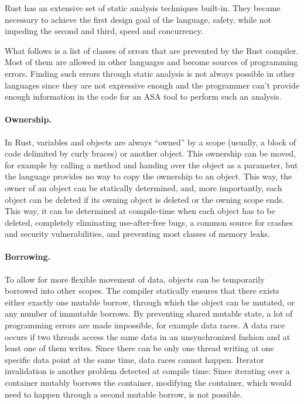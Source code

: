 \documentclass{scrartcl}
\begin{document}
Rust has an extensive set of static analysis techniques built-in. They became necessary to achieve the first design goal of the language, safety, while not impeding the second and third, speed and concurrency.

What follows is a list of classes of errors that are prevented by the Rust compiler. Most of them are allowed in other languages and become sources of programming errors. Finding such errors through static analysis is not always possible in other languages since they are not expressive enough and the programmer can't provide enough information in the code for an ASA tool to perform such an analysis.

\paragraph{Ownership.} In Rust, variables and objects are always "`owned"' by a scope (usually, a block of code delimited by curly braces) or another object. This ownership can be moved, for example by calling a method and handing over the object as a parameter, but the language provides no way to copy the ownership to an object. This way, the owner of an object can be statically determined, and, more importantly, each object can be deleted if its owning object is deleted or the owning scope ends. This way, it can be determined at compile-time when each object has to be deleted, completely eliminating use-after-free bugs, a common source for crashes and security vulnerabilities, and preventing most classes of memory leaks.

\paragraph{Borrowing.} To allow for more flexible movement of data, objects can be temporarily borrowed into other scopes. The compiler statically ensures that there exists either exactly one mutable borrow, through which the object can be mutated, or any number of immutable borrows. By preventing shared mutable state, a lot of programming errors are made impossible, for example data races. A data race occurs if two threads access the same data in an unsynchronized fashion and at least one of them writes. Since there can be only one thread writing at one specific data point at the same time, data races cannot happen. Iterator invalidation is another problem detected at compile time: Since iterating over a container mutably borrows the container, modifying the container, which would need to happen through a second mutable borrow, is not possible.
\end{document}
